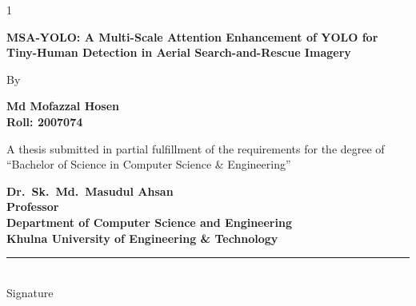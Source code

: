 \begin{spacing}{1}
\setlength{\parskip}{0pt}%
\begin{center}
{\tsizeEighteen\bfseries
MSA-YOLO: A Multi-Scale Attention Enhancement of YOLO for Tiny-Human Detection in Aerial Search-and-Rescue Imagery\par}

\vspace{3\tblanktitle}%

{\tsizeTwelveHalf By\par}

\vspace{2\tblanktitle}%

{\tsizeTwelveHalf\bfseries Md Mofazzal Hosen\\
\normalfont Roll: 2007074\par}

\vspace{\tblanktitle}%

{\tsizeTwelveHalf A thesis submitted in partial fulfillment of the requirements for the degree of\\
``Bachelor of Science in Computer Science \& Engineering''\par}
\end{center}

\vspace{2\tblanktitle}%


\vspace{\tblanktitle}
\noindent\hspace*{0.8in}\begin{minipage}[t]{0.60\textwidth}
{\tsizeTwelveHalf\bfseries Dr.\ Sk.\ Md.\ Masudul Ahsan\\
\normalfont Professor\\
Department of Computer Science and Engineering\\
Khulna University of Engineering \& Technology\par}
\end{minipage}%
\hfill
\begin{minipage}[t]{0.24\textwidth}\centering
  \vspace*{2.4\baselineskip}
  \rule{3.4cm}{0.4pt}\\ {\tsizeTwelveHalf Signature}
\end{minipage}


\end{spacing}
